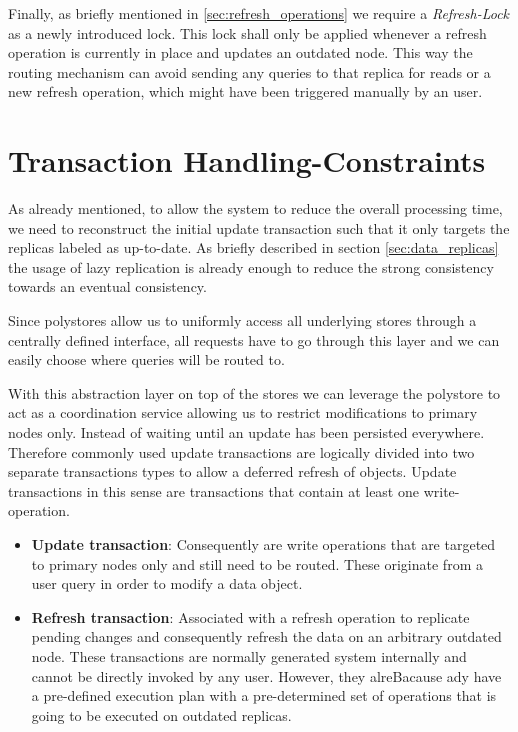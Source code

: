 Finally, as briefly mentioned in \ref{sec:refresh_operations} we require a \emph{Refresh-Lock} as a newly introduced lock.
This lock shall only be applied whenever a refresh operation is currently in place and updates an outdated node. 
This way the routing mechanism can avoid sending any queries to that replica for reads or a new refresh operation, which might have been triggered manually by an user.




\section{Transaction Handling-Constraints}
\label{sec:tx_handling}

As already mentioned, to allow the system to reduce the overall processing time, we need to reconstruct the initial update transaction such that it only 
targets the replicas labeled as up-to-date. As briefly described in section \ref{sec:data_replicas} the usage of lazy replication is already enough to reduce the strong
consistency towards an eventual consistency.

Since polystores allow us to uniformly access all underlying stores through a centrally defined interface, 
all requests have to go through this layer and we can easily choose where queries will be routed to. 

With this abstraction layer on top of the stores we can leverage the polystore to act as a coordination service allowing us to restrict modifications to primary nodes only. 
Instead of waiting until an update has been persisted everywhere.
Therefore commonly used update transactions are logically divided into two separate transactions types to allow a deferred refresh of objects.
Update transactions in this sense are transactions that contain at least one write-operation.
\begin{itemize}
    \item \textbf{Update transaction}:  Consequently are write operations that are targeted to primary nodes only and still need to be routed. 
                                        These originate from a user query in order to modify a data object.

    \item \textbf{Refresh transaction}: Associated with a refresh operation to replicate pending changes and consequently refresh the data on an arbitrary outdated node.
                                        These transactions are normally generated system internally and cannot be directly invoked by any user. 
                                        However, they alreBacause ady have a pre-defined execution plan with a pre-determined set of operations that is going to be executed on outdated replicas.               
\end{itemize}


